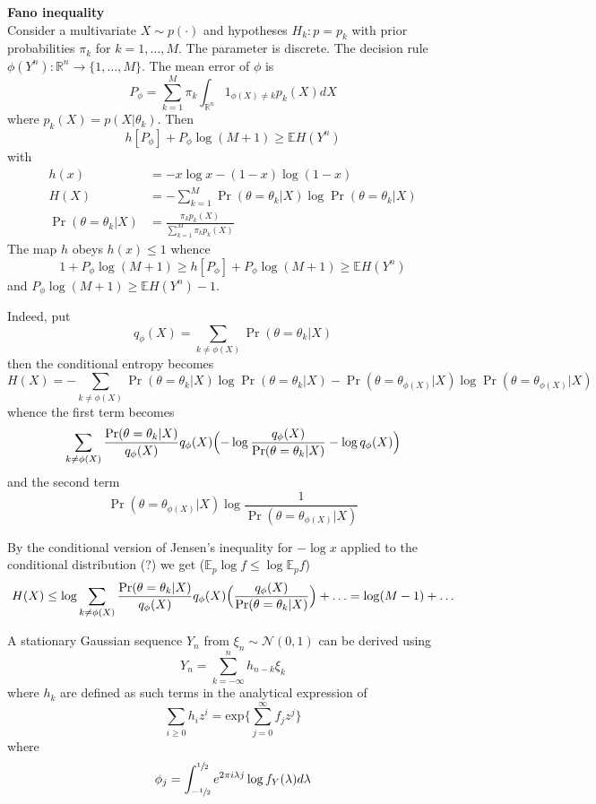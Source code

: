 \documentclass[a4paper]{article}
\newcommand{\Real}{\mathbb{R}}
\newcommand{\Ncal}{\mathcal{N}}
\newcommand{\ex}{\mathbb{E}}
\begin{document}
\noindent\textbf{Fano inequality}\hfill\\
Consider a multivariate $X\sim p(\cdot)$ and hypotheses $H_k: p=p_k$ with prior
probabilities $\pi_k$ for $k=1,\ldots, M$. The parameter is discrete. The decision
rule $\phi(Y^n):\Real^n\to \{1,\ldots,M\}$. The mean error of $\phi$ is
\[P_\phi = \sum_{k=1}^M \pi_k \int_{\Real^n} 1_{\phi(X)\neq k} p_k(X) dX\]
where $p_k(X) = p(X\rvert \theta_k)$. Then
\[h[P_\phi] + P_\phi \log(M+1 )\geq \ex H(Y^n)\]
with
\begin{align*}
	h(x) &= - x \log x - (1-x) \log (1-x)\\
	H(X) &= - \sum_{k=1}^M \Pr(\theta=\theta_k\rvert X) \log \Pr(\theta=\theta_k\rvert X)\\
	\Pr(\theta=\theta_k\rvert X) &= \frac{\pi_k p_k(X)}{\sum_{k=1}^M \pi_k p_k(X)}
\end{align*}
The map $h$ obeys $h(x)\leq 1$ whence
\[1+P_\phi \log(M+1 )\geq h[P_\phi] + P_\phi \log(M+1)\geq \ex H(Y^n)\]
and $P_\phi \log(M+1)\geq \ex H(Y^n)-1$.

Indeed, put 
\[q_{\phi}(X) = \sum_{k\neq \phi(X)}\Pr(\theta=\theta_k\rvert X)\]
then the conditional entropy becomes
\[
H(X)
= - \sum_{k\neq \phi(X)} \Pr(\theta=\theta_k\rvert X) \log \Pr(\theta=\theta_k\rvert X)
- \Pr(\theta=\theta_{\phi(X)}\rvert X) \log \Pr(\theta=\theta_{\phi(X)}\rvert X)
\]
whence the first term becomes
\[
\sum_{k\neq \phi(X)}
\frac{\Pr(\theta=\theta_k\rvert X)}{q_{\phi}(X)} q_{\phi}(X) \Bigl(
-\log \frac{q_{\phi}(X)}{\Pr(\theta=\theta_k\rvert X)} - \log q_{\phi}(X)
\Bigr)
\]
and the second term
\[
\Pr(\theta=\theta_{\phi(X)}\rvert X) \log \frac{1}{\Pr(\theta=\theta_{\phi(X)}\rvert X)}
\]

By the conditional version of Jensen's inequality for $-\log x$ applied to the
conditional distribution (?) we get ($\ex_p \log f \leq \log \ex_p f$)
\[
H(X)
\leq  \log \sum_{k\neq \phi(X)} \frac{\Pr(\theta=\theta_k\rvert X)}{q_{\phi}(X)} q_{\phi}(X)
\Bigl(\frac{q_{\phi}(X)}{\Pr(\theta=\theta_k\rvert X)}\Bigr)
+ \ldots
= \log(M-1) + \ldots
\]


A stationary Gaussian sequence $Y_n$ from $\xi_n\sim \Ncal(0,1)$ can be derived
using
\[
Y_n = \sum_{k=-\infty}^n h_{n-k} \xi_k
\]
where $h_k$ are defined as such terms in the analytical expression of 
\[
\sum_{i\geq 0} h_i z^i = \text{exp}\{ \sum_{j=0}^\infty f_j z^j \}
\]
where
\[\phi_j = \int_{-\sfrac{1}{2}}^{\sfrac{1}{2}} e^{2\pi i \lambda j } \log f_Y( \lambda ) d\lambda \]

\end{document}
